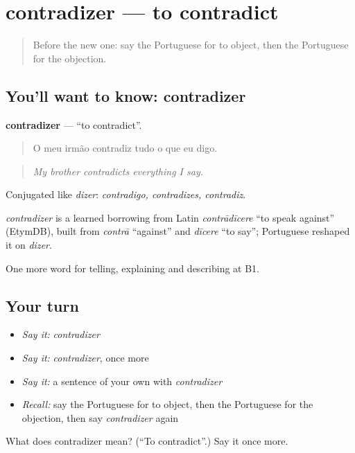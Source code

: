 \section[contradizer]{contradizer — to contradict}

\label{lesson:PT-C338-contradizer}



\begin{quote}
Before the new one: say the Portuguese for to object, then the Portuguese for the objection.
\end{quote}

\subsection*{You'll want to know: contradizer}
\textbf{contradizer} — \textquotedblleft{}to contradict\textquotedblright{}.

\begin{quote}
O meu irmão contradiz tudo o que eu digo.
\end{quote}

\begin{quote}
\emph{My brother contradicts everything I say.}
\end{quote}

Conjugated like \emph{dizer}: \emph{contradigo, contradizes, contradiz}.

\begin{cousinweb}
\emph{contradizer} is a learned borrowing from Latin \emph{contrādīcere} \textquotedblleft{}to speak against\textquotedblright{} (EtymDB), built from \emph{contrā} \textquotedblleft{}against\textquotedblright{} and \emph{dīcere} \textquotedblleft{}to say\textquotedblright{}; Portuguese reshaped it on \emph{dizer}.
\end{cousinweb}

\begin{grammarlens}[title={What you've built}]
One more word for telling, explaining and describing at B1.
\end{grammarlens}

\subsection*{Your turn}
\begin{itemize}
\raggedright
  \item \emph{Say it:} \emph{contradizer}
  \item \emph{Say it:} \emph{contradizer}, once more
  \item \emph{Say it:} a sentence of your own with \emph{contradizer}
  \item \emph{Recall:} say the Portuguese for to object, then the Portuguese for the objection, then say \emph{contradizer} again
\end{itemize}

\begin{tcolorbox}[breakable,colback=teal!4,colframe=teal!35!black,title={Before you move on}]
What does contradizer mean? (\textquotedblleft{}To contradict\textquotedblright{}.) Say it once more.
\end{tcolorbox}
